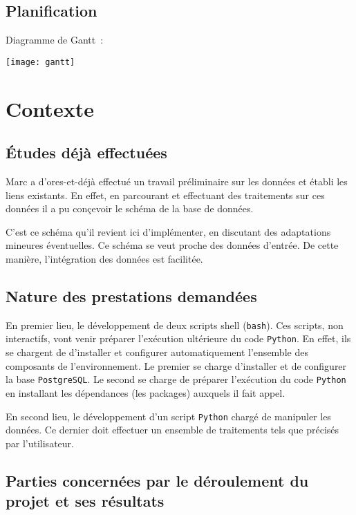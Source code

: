 \documentclass[french,12pt]{article}
\begin{document}
\subsection{Planification}

Diagramme de Gantt~:

\texttt{[image: gantt]}

\section{Contexte}

\subsection{Études déjà effectuées}

Marc  a d'ores-et-déjà effectué un travail préliminaire sur les données et établi les liens existants. En effet, en parcourant et effectuant des traitements sur ces données il a pu conçevoir le schéma de la base de données.

C'est ce schéma qu'il revient ici d'implémenter, en discutant des adaptations mineures éventuelles. Ce schéma se veut proche des données d'entrée. De cette manière, l'intégration des données est facilitée.

\subsection{Nature des prestations demandées}

En premier lieu, le développement de deux scripts shell (\texttt{bash}). Ces scripts, non interactifs, vont venir préparer l'exécution ultérieure du code \texttt{Python}. En effet, ils se chargent de d'installer et configurer automatiquement l'ensemble des composants de l'environnement. Le premier se charge d'installer et de configurer la base \texttt{PostgreSQL}. Le second se charge de préparer l'exécution du code \texttt{Python} en installant les dépendances (les packages) auxquels il fait appel.

En second lieu, le développement d'un script \texttt{Python} chargé de manipuler les données. Ce dernier doit effectuer un ensemble de traitements tels que précisés par l'utilisateur.

\subsection{Parties concernées par le déroulement du projet et ses résultats}
\end{document}
